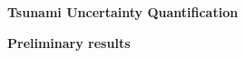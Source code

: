 \documentclass[12pt]{article}
\begin{document}
\begin{center}{\Large\bf Tsunami Uncertainty Quantification}\vskip 5pt
        
\bf Preliminary results
\end{center}
\vskip 15pt







\clearpage
%




             
\clearpage

\clearpage


\end{document}
